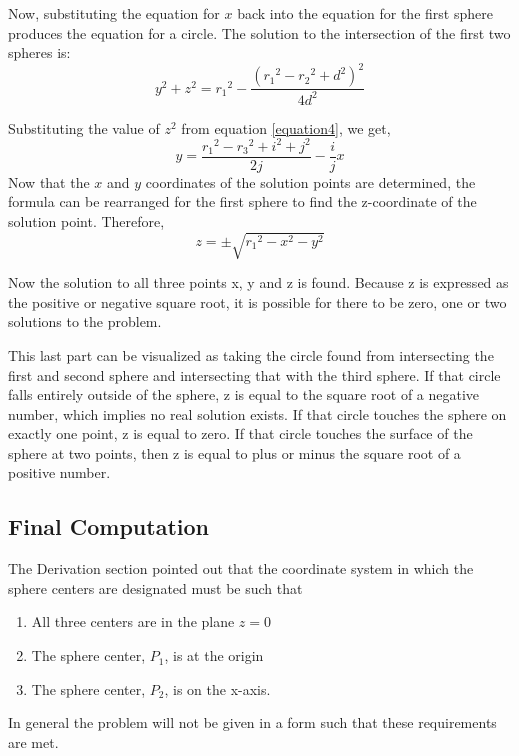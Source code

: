 Now, substituting the equation for $x$ back into the equation for the first sphere produces the equation for a circle. The solution to the intersection of the first two spheres is:
\begin{equation}
y^2+z^2={r_1}^2-\frac{({r_1}^2-{r_2}^2+d^2)^2}{4d^2} \nonumber
\end{equation}

Substituting the value of $z^2$ from equation \ref{equation4}, we get, 
\begin{equation}
y=\frac{{r_1}^2-{r_3}^2+i^2+j^2}{2j}-\frac{i}{j}x
\end{equation}
Now that the $x$ and $y$ coordinates of the solution points are determined, the formula can be rearranged for the first sphere to find the z-coordinate of the solution point. Therefore,
\begin{equation}
	z=\pm \sqrt{{r_1}^2-x^2-y^2}
\end{equation}

Now the solution to all three points x, y and z is found. Because z is expressed as the positive or negative square root, it is possible for there to be zero, one or two solutions to the problem.

This last part can be visualized as taking the circle found from intersecting the first and second sphere and intersecting that with the third sphere. If that circle falls entirely outside of the sphere, z is equal to the square root of a negative number, which implies no real solution exists. If that circle touches the sphere on exactly one point, z is equal to zero. If that circle touches the surface of the sphere at two points, then z is equal to plus or minus the square root of a positive number.

\subsection{Final Computation}

The Derivation section pointed out that the coordinate system in which the sphere centers are designated must be such that
\begin{enumerate}
	\item All three centers are in the plane $z=0$
	\item The sphere center, $P_1$, is at the origin
	\item The sphere center, $P_2$, is on the x-axis.
\end{enumerate}
In general the problem will not be given in a form such that these requirements are met.

